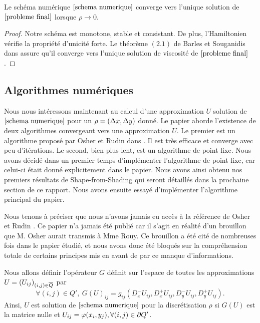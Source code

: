 \begin{theorem}
    Le schéma numérique $\eqref{schema numerique}$ converge vers l'unique solution de $\eqref{probleme final}$ lorsque $\rho \rightarrow 0$.
\end{theorem}
\begin{proof}
    Notre schéma est monotone, stable et consistant. De plus, l'Hamiltonien vérifie la propriété d'unicité forte. Le théorème $(2.1)$ de Barles et Souganidis dans \cite{Barles_et_Souganidis} assure qu'il converge vers l'unique solution de viscosité de $\eqref{probleme final}$.
\end{proof}


\subsection{Algorithmes numériques}

Nous nous intéressons maintenant au calcul d'une approximation $U$ solution de $\eqref{schema numerique}$ pour un $\rho=(\Delta x,\Delta y)$ donné. Le papier aborde l'existence de deux algorithmes convergeant vers une approximation $U.$ Le premier est un algorithme proposé par Osher et Rudin dans \cite{Osher_et_Rudin}. Il est très efficace et converge avec peu d'itérations. Le second, bien plus lent, est un algorithme de point fixe. Nous avons décidé dans un premier temps d'implémenter l'algorithme de point fixe, car celui-ci était donné explicitement dans le papier. Nous avons ainsi obtenu nos premiers résultats de Shape-from-Shading qui seront détaillés dans la prochaine section de ce rapport. Nous avons ensuite essayé d'implémenter l'algorithme principal du papier.

\begin{noremark}
    Nous tenons à préciser que nous n'avons jamais eu accès à la référence de Osher et Rudin \cite{Osher_et_Rudin}. Ce papier n'a jamais été publié car il s'agit en réalité d'un brouillon que M. Osher aurait transmis à Mme Rouy. Ce brouillon a été cité de nombreuses fois dans le papier étudié, et nous avons donc été bloqués sur la compréhension totale de certains principes mis en avant de par ce manque d'informations.
\end{noremark}

Nous allons définir l'opérateur $G$ définit sur l'espace de toutes les approximations $U=(U_{ij})_{(i,j)\in \overline{Q}}$ par
\begin{equation*}
    \forall (i,j)\in Q', \  G\left(U\right)_{ij}=g_{ij}\left(D_x^-U_{ij},D_x^+U_{ij},D_y^-U_{ij},D_y^+U_{ij}\right).
\end{equation*}
Ainsi, $U$ est solution de $\eqref{schema numerique}$ pour la discrétisation $\rho$ si $G(U)$ est la matrice nulle et $U_{ij} = \varphi(x_i,y_j), \forall(i,j)\in \mathop{}\!{\partial} Q'$. 

